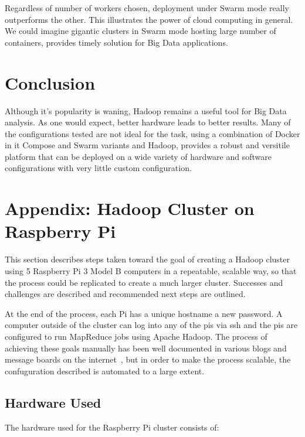 Regardless of number of workers chosen, deployment under Swarm mode
really outperforms the other. This illustrates the power of cloud
computing in general. We could imagine gigantic clusters in Swarm mode
hosting large number of containers, provides timely solution for Big
Data applications.


\section{Conclusion}\label{s:conclusion}

Although it's popularity is waning, Hadoop remains a useful tool for
Big Data analysis. As one would expect, better hardware leads to
better results.  Many of the configurations tested are not ideal for
the task, using a combination of Docker in it Compose and Swarm
variants and Hadoop, provides a robust and versitile platform that can
be deployed on a wide variety of hardware and software configurations
with very little custom configuration.

\section{Appendix: Hadoop Cluster on Raspberry Pi}\label{s:appendix}
This section describes steps taken toward the goal of creating a
Hadoop cluster using 5 Raspberry Pi 3 Model B computers in a
repeatable, scalable way, so that the process could be replicated to
create a much larger cluster. Successes and challenges are described
and recommended next steps are outlined.

At the end of the process, each Pi has a unique hostname a new
password. A computer outside of the cluster can log into any of the
pis via ssh and the pis are configured to run MapReduce jobs using
Apache Hadoop. The process of achieving these goals manually has been
well documented in various blogs and message boards on the
internet~\cite{hid-sp18-419-headless}, but in order to make the
process scalable, the confuguration described is automated to a large
extent.

\subsection{Hardware Used}

The hardware used for the Raspberry Pi cluster consists of:

